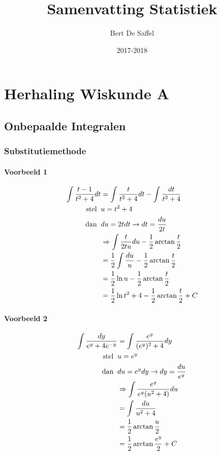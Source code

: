 \documentclass[12pt]{report}
\title{Samenvatting Statistiek}
\author{Bert De Saffel}
\date{2017-2018}
\begin{document}
\maketitle
\tableofcontents

\part{Herhaling Wiskunde A}
\chapter{Onbepaalde Integralen}
\section{Substitutiemethode}
\subsection{Voorbeeld 1}
\begin{equation*}
    \begin{split}
        \int \frac{t - 1}{t^2 + 4}dt & = \int \frac{t}{t^2 + 4}dt - \int \frac{dt}{t^2 + 4} \\
        \hbox{stel}\;\; &  u = t^2 + 4        \\
        \hbox{dan}\;\; & du = 2tdt \rightarrow dt = \frac{du}{2t} \\
        & \Rightarrow \int \frac{t}{2t u} du - \frac{1}{2}\arctan{\frac{t}{2}} \\
        & = \frac{1}{2}\int \frac{du}{u} - \frac{1}{2}\arctan{\frac{t}{2}}\\
        & = \frac{1}{2}\ln{u} - \frac{1}{2}\arctan{\frac{t}{2}} \\
        & = \frac{1}{2}\ln{t^2 + 4} - \frac{1}{2}\arctan{\frac{t}{2}} + C
    \end{split}
\end{equation*}
\subsection{Voorbeeld 2}
\begin{equation*}
    \begin{split}
        \int \frac{dy}{e^y + 4e^{-y}} & = \int \frac{e^y}{(e^y)^2 + 4} dy \\
        \hbox{stel}\;\; & u = e^y \\
        \hbox{dan}\;\; & du = e^ydy \rightarrow dy = \frac{du}{e^y}\\
        & \Rightarrow \int \frac{e^y}{e^y(u^2 + 4)} du \\
        & = \int \frac{du}{u^2 + 4} \\
        & = \frac{1}{2}\arctan{\frac{u}{2}}\\
        & = \frac{1}{2}\arctan{\frac{e^y}{2}} + C\\
    \end{split}
\end{equation*}
\end{document}
